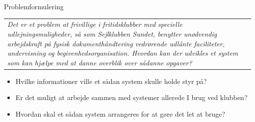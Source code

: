 \begin{frame}{Problemformulering}
\begin{center}


\begin{tabular}{|p{8cm}|}
  
 \textit{Det er et problem at frivillige i fritidsklubber med specielle udlejningsmuligheder, så som Sejlklubben Sundet, benytter unødvendig arbejdskraft på fysisk dokumenthåndtering vedrørende udlånte faciliteter, undervisning og begivenhedsorganisation. Hvordan kan der udvikles et system som kan hjælpe med at danne overblik over sådanne opgaver?}
    \end{tabular}
    \end{center}
  \begin{itemize}
      
    \item Hvilke informationer ville et sådan system skulle holde styr på?
    \item Er det muligt at arbejde sammen med systemer allerede I brug ved klubben?
    \item Hvordan skal et sådan system arrangeres for at gøre det let at bruge?
  \end{itemize}
\end{frame}